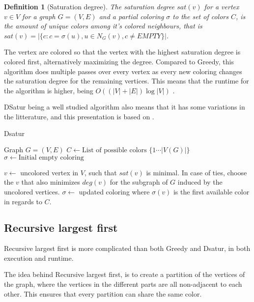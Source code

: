 \documentclass{amsart}
\newtheorem{definition}{Definition}[section]
\begin{document}
\begin{definition}[Saturation degree]
    The saturation degree $sat(v)$ for a vertex $v \in V$ for a graph $G =
    (V,E)$ and a partial coloring $\sigma$ to the set of colors $C$, is the amount of unique colors among
    it's colored neighbours, that is $sat(v) = |\{c  : c = \sigma(u), u \in N_G(v),c \neq EMPTY  \}|$.
\end{definition}

The vertex are colored so that the vertex with the highest saturation degree is
colored first, alternatively maximizing the degree. Compared to Greedy, this
algorithm does multiple passes over every vertex as every new coloring changes
the saturation degree for the remaining vertices. This means that the runtime
for the algorithm is higher, being
$O((|V|+|E|)\log{|V|})$ \cite{Constructive}.

DSatur being a well studied algorithm also means that it has some variations in 
the litterature, and this presentation is based on \cite{Constructive}.

\begin{algorithm}[H]
  \caption{Dsatur}
  \begin{algorithmic}[1]
      \REQUIRE Graph $G = (V,E)$
      \STATE $C \leftarrow \text{List of possible colors $\{1 \cdots |V(G)| \}$ }$
      \STATE $\sigma \leftarrow \text{Initial empty coloring}$


        \STATE $v \leftarrow$ uncolored vertex in $V$, such that $sat(v)$ is
        minimal. In case of ties, choose the $v$ that also minimizes $deg(v)$
        for the subgraph of $G$ induced by the uncolored vertices.
        \STATE $\sigma \leftarrow$ updated coloring where $\sigma(v)$ is the first
        available color in regards to $C$.
      \ENDFOR
  \end{algorithmic}
\end{algorithm}

\subsection{Recursive largest first}

Recursive largest first is more complicated than both Greedy and Dsatur, in both
execution and runtime. 

The idea behind Recursive largest first, is to create a partition of the
vertices of the graph, where the vertices in the different parts are all
non-adjacent to each other. This ensures that every partition can share the
same color. 
\end{document}
